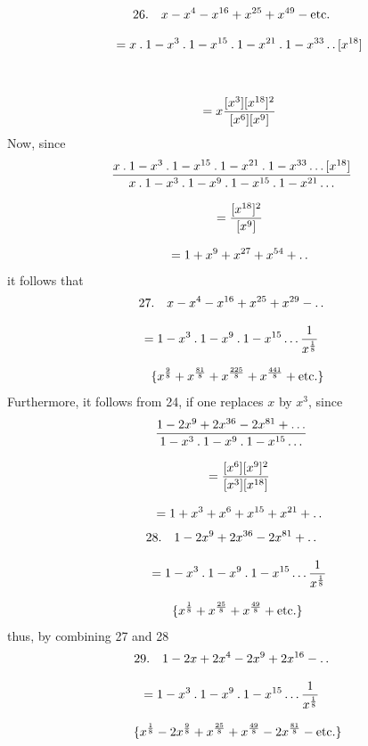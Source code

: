 \[
\begin{gathered}
26.\quad x-x^{4}-x^{16}+x^{25}+x^{49}-\mathrm{etc.}
 \\[8pt]\quad{}=x\mathbin{.}1-x^{3}\mathbin{.}1-x^{15}\mathbin{.}1-x^{21}\mathbin{.}1-x^{33}\mathinner{.\,.}[x^{18}]\\[8pt]
 \\[8pt]\quad{}=x\frac{[x^{3}][x^{18}]^{2}}{[x^{6}][x^{9}]}
\end{gathered}
\]
Now, since
\[
\begin{gathered}\frac{x\mathbin{.}1-x^{3}\mathbin{.}1-x^{15}\mathbin{.}1-x^{21}\mathbin{.}1-x^{33}\mathinner{.\,.\,.}[x^{18}]}
     {x\mathbin{.}1-x^{3}\mathbin{.}1-x^{9}\mathbin{.}1-x^{15}\mathbin{.}1-x^{21}\mathinner{.\,.\,.}}
 \\[8pt]\quad{}=\frac{[x^{18}]^{2}}{[x^{9}]}
\\[8pt]\quad{} =1+x^{9}+x^{27}+x^{54}+\mathinner{.\,.}\end{gathered}
\]
it follows that
\[
\begin{gathered}
27.\quad x-x^{4}-x^{16}+x^{25}+x^{29}-\mathinner{.\,.}\\[8pt]
 =1-x^{3}\mathbin{.}1-x^{9}\mathbin{.}1-x^{15}\mathinner{.\,.\,.}\frac{1}{x^{\frac18}}
 \\[8pt]\quad{}\{x^{\frac98}+x^{\frac{81}{8}}+x^{\frac{225}{8}}+x^{\frac{441}{8}}+\mathrm{etc.}\}
\end{gathered}
\]
Furthermore, it follows from 24, if one replaces $x$ by $x^{3}$, since
\[
\begin{gathered}\frac{1-2x^{9}+2x^{36}-2x^{81}+\mathinner{.\,.\,.}}
     {1-x^{3}\mathbin{.}1-x^{9}\mathbin{.}1-x^{15}\mathinner{.\,.\,.}}
 \\[8pt]\quad{}=\frac{[x^{6}][x^{9}]^{2}}{[x^{3}][x^{18}]}
\\[8pt]\quad{} =1+x^{3}+x^{6}+x^{15}+x^{21}+\mathinner{.\,.}\end{gathered}
\]
\[
\begin{gathered}28.\quad 1-2x^{9}+2x^{36}-2x^{81}+\mathinner{.\,.}
\\[8pt]\quad{} =1-x^{3}\mathbin{.}1-x^{9}\mathbin{.}1-x^{15}\mathinner{.\,.\,.}\frac{1}{x^{\frac18}}
 \\[8pt]\quad{}\{x^{\frac18}+x^{\frac{25}{8}}+x^{\frac{49}{8}}+\mathrm{etc.}\}\end{gathered}
\]
thus, by combining 27 and 28
\[
\begin{gathered}
29.\quad 1-2x+2x^{4}-2x^{9}+2x^{16}-\mathinner{.\,.}\\[8pt]
 =1-x^{3}\mathbin{.}1-x^{9}\mathbin{.}1-x^{15}\mathinner{.\,.\,.}\frac{1}{x^{\frac18}}
 \\[8pt]\quad{}\{x^{\frac18}-2x^{\frac98}+x^{\frac{25}{8}}+x^{\frac{49}{8}}-2x^{\frac{81}{8}}-\mathrm{etc.}\}
\end{gathered}
\]

